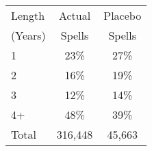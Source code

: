 \begin{tabular}{lcc}
\toprule
Length & Actual & Placebo \\
(Years) & Spells & Spells \\
\midrule
1 & 23\% & 27\% \\
2 & 16\% & 19\% \\
3 & 12\% & 14\% \\
4+ & 48\% & 39\% \\
Total &      316,448 &       45,663 \\
\bottomrule
\end{tabular}
